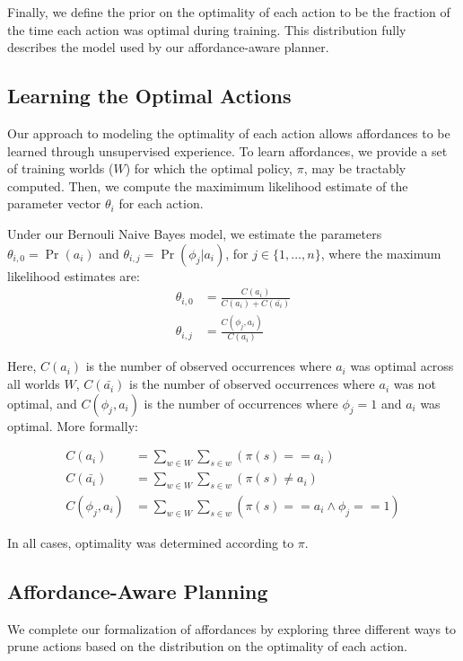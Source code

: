 \documentclass[letterpaper]{article}
\newcommand{\argmax}{\operatornamewithlimits{argmax}} %
\begin{document}
Finally, we define the prior on the optimality of each action to be the fraction of the
time each action was optimal during training. This distribution fully describes the model used by our affordance-aware planner. 

\subsection{Learning the Optimal Actions}
Our approach to modeling the optimality of each action allows affordances to be learned through unsupervised experience.
To learn affordances, we provide a set of training worlds ($W$) for which the optimal policy, $\pi$,
may be tractably computed. Then, we compute the maximimum likelihood estimate of the parameter vector $\theta_i$ for each action.

Under our Bernouli Naive Bayes model, we estimate the parameters
$\theta_{i,0} = \Pr(a_i)$ and $\theta_{i,j} = \Pr(\phi_j | a_i)$, for $j \in \{1, \ldots, n \}$, where the maximum likelihood estimates are:
\begin{align}
\theta_{i,0} &= \frac{C(a_i)}{C(a_i) + C(\bar{a_i})} \\
\theta_{i,j} &= \frac{C(\phi_j, a_i)}{C(a_i)}
\end{align}

Here, $C(a_i)$ is the number of observed occurrences where $a_i$ was optimal across all worlds $W$,
$C(\bar{a_i})$ is the number of observed occurrences where $a_i$ was not optimal,
and $C(\phi_j, a_i)$ is the number of occurrences where $\phi_j=1$ and $a_i$ was optimal. More formally:

\begin{align}
C(a_i) &= \sum_{w \in W} \sum_{s \in w} (\pi(s) == a_i) \\
C(\bar{a_i}) &= \sum_{w \in W} \sum_{s \in w} (\pi(s) \not= a_i) \\
C(\phi_j, a_i) &= \sum_{w \in W} \sum_{s \in w} (\pi(s) == a_i \wedge \phi_j == 1)
\end{align}

In all cases, optimality was determined according to $\pi$.

\subsection{Affordance-Aware Planning}
\label{sec:action_pruning}
We complete our formalization of affordances by exploring three different ways to prune actions
based on the distribution on the optimality of each action.
\end{document}
